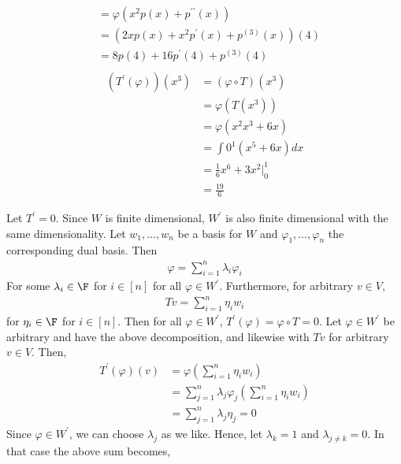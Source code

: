 \documentclass{book}
\begin{document}
\begin{enumerate}[label=\arabic*)]
\begin{enumerate}[label=\alph*)]
\begin{align*}
            & = \varphi(x^2p(x) + p^{\prime\prime}(x)) \\
            & = \left(2xp(x) + x^2p^{\prime}(x) + p^{(3)}(x)\right)(4) \\
            & = 8p(4) + 16p^{\prime}(4) + p^{(3)}(4) \\
          \end{align*}
        \ii
          \begin{align*}
            \left(T^{\prime}(\varphi)\right)(x^3) & = (\varphi \circ T)(x^3) \\
            & = \varphi\left( T(x^3) \right) \\
            & = \varphi\left( x^2x^3 + 6x \right) \\
            & = \int{0}^{1}(x^5 + 6x)dx \\
            & = \frac{1}{6}x^6 + 3x^2|_0^1 \\
            & = \frac{19}{6} 
          \end{align*}
      \end{enumerate}
    \ii
      \begin{enumerate}[label=\alph*)]
        \ii 
          Let $T^{\prime} = 0$. Since $W$ is finite dimensional, $W^{\prime}$ is also finite dimensional with the same dimensionality. Let $w_1, \dots, w_n$ be a basis for $W$ and
          $\varphi_1, \dots, \varphi_n$ the corresponding dual basis. Then
          \begin{align*}
            \varphi = \sum_{i = 1}^{n}\lambda_i\varphi_i
          \end{align*}
          For some $\lambda_i \in \F$ for $i \in [n]$ for all $\varphi \in W^{\prime}$. Furthermore, for arbitrary $v \in V$,
          \begin{align*}
            Tv = \sum_{i = 1}^{n}\eta_iw_i
          \end{align*}
          for $\eta_i \in \F$ for $i \in [n]$. Then for all $\varphi \in W^{\prime}$, $T^{\prime}(\varphi) = \varphi \circ T = 0$. Let $\varphi \in W^{\prime}$ be arbitrary and have the
          above decomposition, and likewise with $Tv$ for arbitrary $v \in V$. Then,
          \begin{align*}
            T^{\prime}(\varphi)(v) & = \varphi(\sum_{i = 1}^{n}\eta_iw_i) \\
            & = \sum_{j = 1}^{n}\lambda_j\varphi_j(\sum_{i = 1}^{n}\eta_iw_i) \\
            & = \sum_{j = 1}^{n}\lambda_j\eta_j = 0
          \end{align*}
          Since $\varphi \in W^{\prime}$, we can choose $\lambda_j$ as we like. Hence, let $\lambda_k = 1$ and $\lambda_{j \neq k} = 0$. In that case the above sum becomes,

\end{enumerate}
\end{enumerate}
\end{document}
